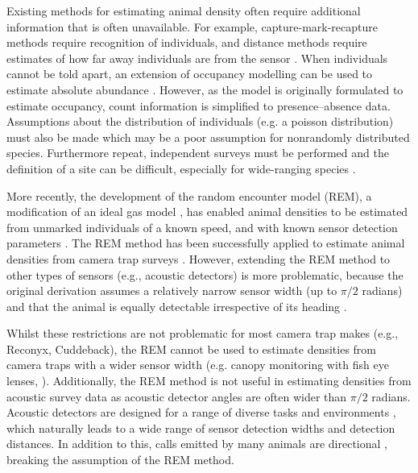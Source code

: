 \documentclass[a4paper,10pt,reqno,oneside]{amsart}
\begin{document}
Existing methods for estimating animal density often require additional information that is often unavailable. For example, capture-mark-recapture methods \citep{karanth1995estimating, trolle2007camera, borchers2014continuous} require recognition of individuals, and distance methods \citep{harris2013applying} require estimates of how far away individuals are from the sensor \citep{barlow2005estimates, marques2011estimating}. When individuals cannot be told apart, an extension of occupancy modelling can be used to estimate absolute abundance \citep{royle2003estimating}. However, as the model is originally formulated to estimate occupancy,  count information is simplified to presence--absence data. Assumptions about the distribution of individuals (e.g. a poisson distribution) must also be made \citep{royle2003estimating} which may be a poor assumption for nonrandomly distributed species. Furthermore repeat, independent surveys must be performed and the definition of a site can be difficult, especially for wide-ranging species \citep{mackenzie2005designing}.

More recently, the development of the random encounter model (REM), a modification of an ideal gas model \citep{yapp1956theory, Hutchinson_Waser_2007}, has enabled animal densities to be estimated from unmarked individuals of a known speed, and with known sensor detection parameters \citep{rowcliffe2008estimating}. The REM method has been successfully applied to estimate animal densities from camera trap surveys \citep{manzo2012estimation, zero2013monitoring}. However, extending the REM method to other types of sensors (e.g., acoustic detectors) is more problematic, because the original derivation assumes a relatively narrow sensor width (up to $\pi/2$ radians) and that the animal is equally detectable irrespective of its heading \citep{rowcliffe2008estimating}. 

Whilst these restrictions are not problematic for most camera trap makes (e.g., Reconyx, Cuddeback), the REM cannot be used to estimate densities from camera traps with a wider sensor width (e.g. canopy monitoring with fish eye lenses, \citet{brusa2014increasing}). Additionally, the REM method is not useful in estimating densities from acoustic survey data as acoustic detector angles are often wider than $\pi/2$ radians.  Acoustic detectors are designed for a range of diverse tasks and environments \citep{kessel2014review}, which naturally leads to a wide range of sensor detection widths and detection distances. In addition to this, calls emitted by many animals are directional \citep{blumstein2011acoustic}, breaking the assumption of the REM method. 
\end{document}
